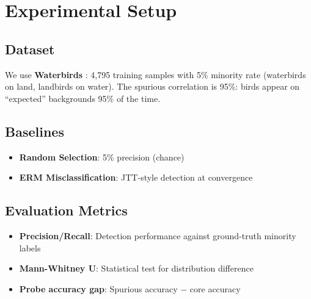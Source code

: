 \section{Experimental Setup}

\subsection{Dataset}

We use \textbf{Waterbirds} \citep{sagawa2019distributionally}: 4,795 training samples with 5\% minority rate (waterbirds on land, landbirds on water). The spurious correlation is 95\%: birds appear on ``expected'' backgrounds 95\% of the time.

\subsection{Baselines}

\begin{itemize}
    \item \textbf{Random Selection}: 5\% precision (chance)
    \item \textbf{ERM Misclassification}: JTT-style detection at convergence
\end{itemize}

\subsection{Evaluation Metrics}

\begin{itemize}
    \item \textbf{Precision/Recall}: Detection performance against ground-truth minority labels
    \item \textbf{Mann-Whitney U}: Statistical test for distribution difference
    \item \textbf{Probe accuracy gap}: Spurious accuracy $-$ core accuracy
\end{itemize}

